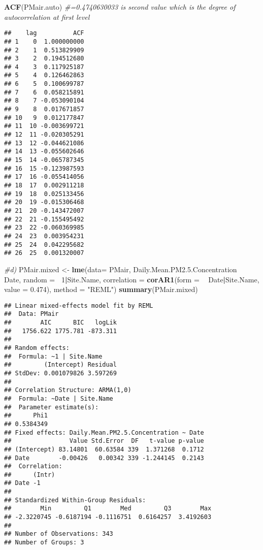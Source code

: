 \documentclass[]{article}
\newenvironment{Shaded}{\begin{snugshade}}{\end{snugshade}}
\newcommand{\KeywordTok}[1]{\textcolor[rgb]{0.13,0.29,0.53}{\textbf{#1}}}
\newcommand{\DataTypeTok}[1]{\textcolor[rgb]{0.13,0.29,0.53}{#1}}
\newcommand{\DecValTok}[1]{\textcolor[rgb]{0.00,0.00,0.81}{#1}}
\newcommand{\FloatTok}[1]{\textcolor[rgb]{0.00,0.00,0.81}{#1}}
\newcommand{\StringTok}[1]{\textcolor[rgb]{0.31,0.60,0.02}{#1}}
\newcommand{\CommentTok}[1]{\textcolor[rgb]{0.56,0.35,0.01}{\textit{#1}}}
\newcommand{\OperatorTok}[1]{\textcolor[rgb]{0.81,0.36,0.00}{\textbf{#1}}}
\newcommand{\NormalTok}[1]{#1}
\begin{document}
\begin{Shaded}
\begin{Highlighting}[]
\KeywordTok{ACF}\NormalTok{(PMair.auto) }\CommentTok{#=0.4740630033 is second value which is the degree of autocorrelation at first level}
\end{Highlighting}
\end{Shaded}

\begin{verbatim}
##    lag          ACF
## 1    0  1.000000000
## 2    1  0.513829909
## 3    2  0.194512680
## 4    3  0.117925187
## 5    4  0.126462863
## 6    5  0.100699787
## 7    6  0.058215891
## 8    7 -0.053090104
## 9    8  0.017671857
## 10   9  0.012177847
## 11  10 -0.003699721
## 12  11 -0.020305291
## 13  12 -0.044621086
## 14  13 -0.055602646
## 15  14 -0.065787345
## 16  15 -0.123987593
## 17  16 -0.055414056
## 18  17  0.002911218
## 19  18  0.025133456
## 20  19 -0.015306468
## 21  20 -0.143472007
## 22  21 -0.155495492
## 23  22 -0.060369985
## 24  23  0.003954231
## 25  24  0.042295682
## 26  25  0.001320007
\end{verbatim}

\begin{Shaded}
\begin{Highlighting}[]
\CommentTok{#d)}
\NormalTok{PMair.mixed <-}\StringTok{ }\KeywordTok{lme}\NormalTok{(}\DataTypeTok{data=}\NormalTok{ PMair, Daily.Mean.PM2.}\FloatTok{5.}\NormalTok{Concentration }\OperatorTok{~}\StringTok{ }\NormalTok{Date, }\DataTypeTok{random =} \OperatorTok{~}\DecValTok{1}\OperatorTok{|}\NormalTok{Site.Name, }\DataTypeTok{correlation =} \KeywordTok{corAR1}\NormalTok{(}\DataTypeTok{form =} \OperatorTok{~}\StringTok{ }\NormalTok{Date}\OperatorTok{|}\NormalTok{Site.Name, }\DataTypeTok{value =} \FloatTok{0.474}\NormalTok{),}
                \DataTypeTok{method =} \StringTok{"REML"}\NormalTok{)}
\KeywordTok{summary}\NormalTok{(PMair.mixed)}
\end{Highlighting}
\end{Shaded}

\begin{verbatim}
## Linear mixed-effects model fit by REML
##  Data: PMair 
##        AIC      BIC   logLik
##   1756.622 1775.781 -873.311
## 
## Random effects:
##  Formula: ~1 | Site.Name
##         (Intercept) Residual
## StdDev: 0.001079826 3.597269
## 
## Correlation Structure: ARMA(1,0)
##  Formula: ~Date | Site.Name 
##  Parameter estimate(s):
##      Phi1 
## 0.5384349 
## Fixed effects: Daily.Mean.PM2.5.Concentration ~ Date 
##                Value Std.Error  DF   t-value p-value
## (Intercept) 83.14801  60.63584 339  1.371268  0.1712
## Date        -0.00426   0.00342 339 -1.244145  0.2143
##  Correlation: 
##      (Intr)
## Date -1    
## 
## Standardized Within-Group Residuals:
##        Min         Q1        Med         Q3        Max 
## -2.3220745 -0.6187194 -0.1116751  0.6164257  3.4192603 
## 
## Number of Observations: 343
## Number of Groups: 3
\end{verbatim}
\end{document}
